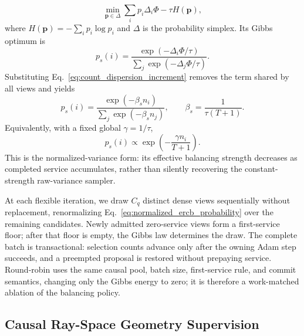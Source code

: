 \begin{equation}
\min_{\mathbf p\in\Delta}
\sum_i p_i \Delta_i\Phi
-
\tau H(\mathbf p),
\label{eq:entropy_sampling_objective}
\end{equation}
where $H(\mathbf p)=-\sum_i p_i\log p_i$ and $\Delta$ is the
probability simplex.  Its Gibbs optimum is
\begin{equation}
p_s(i)
=
\frac{
\exp\!\left(-\Delta_i\Phi/\tau\right)
}{
\sum_j \exp\!\left(-\Delta_j\Phi/\tau\right)
}.
\label{eq:entropy_sampling_general}
\end{equation}
Substituting Eq.~\eqref{eq:count_dispersion_increment} removes the term shared by all views and yields
\begin{equation}
p_s(i)
=
\frac{
\exp(-\beta_s n_i)
}{
\sum_j \exp(-\beta_s n_j)
},
\qquad
\beta_s
=
\frac{1}{\tau(T+1)}.
\label{eq:entropy_view_sampling}
\end{equation}
Equivalently, with a fixed global $\gamma=1/\tau$,
\begin{equation}
p_s(i)
\propto
\exp\!\left(-\frac{\gamma n_i}{T+1}\right).
\label{eq:normalized_ercb_probability}
\end{equation}
This is the normalized-variance form: its effective balancing strength
decreases as completed service accumulates, rather than silently recovering
the constant-strength raw-variance sampler.

At each flexible iteration, we draw $C_q$ distinct dense views sequentially
without replacement, renormalizing Eq.~\eqref{eq:normalized_ercb_probability}
over the remaining candidates.  Newly admitted zero-service views form a
first-service floor; after that floor is empty, the Gibbs law determines the
draw.  The complete batch is transactional: selection counts advance only
after the owning Adam step succeeds, and a preempted proposal is restored
without prepaying service.  Round-robin uses the same causal pool, batch size,
first-service rule, and commit semantics, changing only the Gibbs energy to
zero; it is therefore a work-matched ablation of the balancing policy.


\subsection{Causal Ray-Space Geometry Supervision}
\label{ssec:carve}

